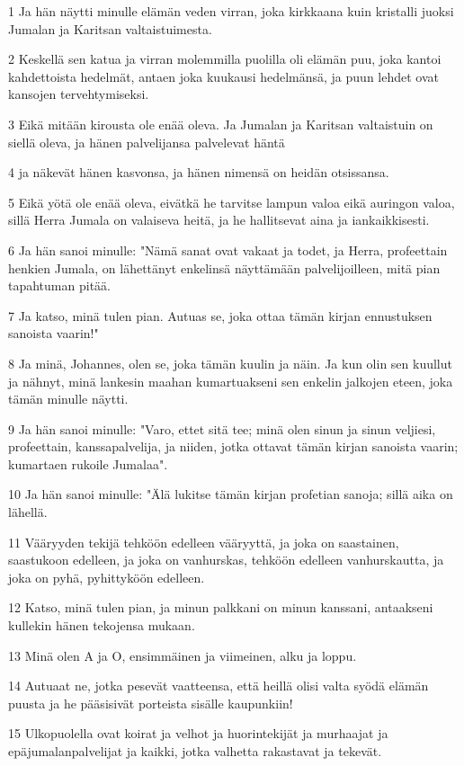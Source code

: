 \par 1 Ja hän näytti minulle elämän veden virran, joka kirkkaana kuin kristalli juoksi Jumalan ja Karitsan valtaistuimesta.
\par 2 Keskellä sen katua ja virran molemmilla puolilla oli elämän puu, joka kantoi kahdettoista hedelmät, antaen joka kuukausi hedelmänsä, ja puun lehdet ovat kansojen tervehtymiseksi.
\par 3 Eikä mitään kirousta ole enää oleva. Ja Jumalan ja Karitsan valtaistuin on siellä oleva, ja hänen palvelijansa palvelevat häntä
\par 4 ja näkevät hänen kasvonsa, ja hänen nimensä on heidän otsissansa.
\par 5 Eikä yötä ole enää oleva, eivätkä he tarvitse lampun valoa eikä auringon valoa, sillä Herra Jumala on valaiseva heitä, ja he hallitsevat aina ja iankaikkisesti.
\par 6 Ja hän sanoi minulle: "Nämä sanat ovat vakaat ja todet, ja Herra, profeettain henkien Jumala, on lähettänyt enkelinsä näyttämään palvelijoilleen, mitä pian tapahtuman pitää.
\par 7 Ja katso, minä tulen pian. Autuas se, joka ottaa tämän kirjan ennustuksen sanoista vaarin!"
\par 8 Ja minä, Johannes, olen se, joka tämän kuulin ja näin. Ja kun olin sen kuullut ja nähnyt, minä lankesin maahan kumartuakseni sen enkelin jalkojen eteen, joka tämän minulle näytti.
\par 9 Ja hän sanoi minulle: "Varo, ettet sitä tee; minä olen sinun ja sinun veljiesi, profeettain, kanssapalvelija, ja niiden, jotka ottavat tämän kirjan sanoista vaarin; kumartaen rukoile Jumalaa".
\par 10 Ja hän sanoi minulle: "Älä lukitse tämän kirjan profetian sanoja; sillä aika on lähellä.
\par 11 Vääryyden tekijä tehköön edelleen vääryyttä, ja joka on saastainen, saastukoon edelleen, ja joka on vanhurskas, tehköön edelleen vanhurskautta, ja joka on pyhä, pyhittyköön edelleen.
\par 12 Katso, minä tulen pian, ja minun palkkani on minun kanssani, antaakseni kullekin hänen tekojensa mukaan.
\par 13 Minä olen A ja O, ensimmäinen ja viimeinen, alku ja loppu.
\par 14 Autuaat ne, jotka pesevät vaatteensa, että heillä olisi valta syödä elämän puusta ja he pääsisivät porteista sisälle kaupunkiin!
\par 15 Ulkopuolella ovat koirat ja velhot ja huorintekijät ja murhaajat ja epäjumalanpalvelijat ja kaikki, jotka valhetta rakastavat ja tekevät.
